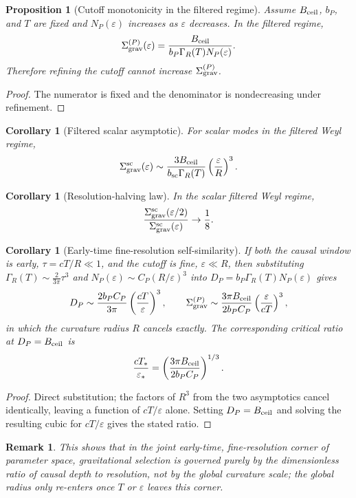 \documentclass[11pt,a4paper]{article}
\newtheorem{proposition}[theorem]{Proposition}
\newtheorem{corollary}[theorem]{Corollary}
\newtheorem{remark}[theorem]{Remark}
\begin{document}
\begin{proposition}[Cutoff monotonicity in the filtered regime]
Assume $B_{\rm ceil}$, $b_P$, and $T$ are fixed and $N_P(\varepsilon)$ increases as $\varepsilon$ decreases.  In the filtered regime,
\[
\Sigma_{\rm grav}^{(P)}(\varepsilon)=
\frac{B_{\rm ceil}}{b_P\Gamma_R(T)N_P(\varepsilon)}.
\]
Therefore refining the cutoff cannot increase $\Sigma_{\rm grav}^{(P)}$.
\end{proposition}
\begin{proof}
The numerator is fixed and the denominator is nondecreasing under refinement.\end{proof}

\begin{corollary}[Filtered scalar asymptotic]
For scalar modes in the filtered Weyl regime,
\[
\Sigma_{\rm grav}^{\rm sc}(\varepsilon)
\sim
\frac{3B_{\rm ceil}}{b_{\rm sc}\Gamma_R(T)}\left(\frac{\varepsilon}{R}\right)^3.
\]
\end{corollary}

\begin{corollary}[Resolution-halving law]
In the scalar filtered Weyl regime,
\[
\frac{\Sigma_{\rm grav}^{\rm sc}(\varepsilon/2)}{\Sigma_{\rm grav}^{\rm sc}(\varepsilon)}\to\frac18.
\]
\end{corollary}

\begin{corollary}[Early-time fine-resolution self-similarity]
\label{cor:double-asymptotic}
If both the causal window is early, $\tau=cT/R\ll1$, and the cutoff is fine, $\varepsilon\ll R$, then substituting $\Gamma_R(T)\sim\frac{2}{3\pi}\tau^3$ and $N_P(\varepsilon)\sim C_P(R/\varepsilon)^3$ into $D_P=b_P\Gamma_R(T)N_P(\varepsilon)$ gives
\[
D_P\sim\frac{2b_PC_P}{3\pi}\left(\frac{cT}{\varepsilon}\right)^3,
\qquad
\Sigma_{\rm grav}^{(P)}\sim\frac{3\pi B_{\rm ceil}}{2b_PC_P}\left(\frac{\varepsilon}{cT}\right)^3,
\]
in which the curvature radius $R$ cancels exactly.  The corresponding critical ratio at $D_P=B_{\rm ceil}$ is
\[
\frac{cT_*}{\varepsilon_*}=\left(\frac{3\pi B_{\rm ceil}}{2b_PC_P}\right)^{1/3}.
\]
\end{corollary}
\begin{proof}
Direct substitution; the factors of $R^3$ from the two asymptotics cancel identically, leaving a function of $cT/\varepsilon$ alone.  Setting $D_P=B_{\rm ceil}$ and solving the resulting cubic for $cT/\varepsilon$ gives the stated ratio.\end{proof}
\begin{remark}
This shows that in the joint early-time, fine-resolution corner of parameter space, gravitational selection is governed purely by the dimensionless ratio of causal depth to resolution, not by the global curvature scale; the global radius only re-enters once $T$ or $\varepsilon$ leaves this corner.
\end{remark}
\end{document}
